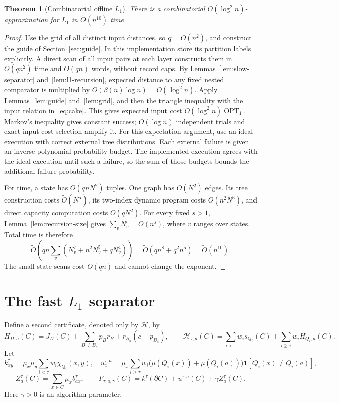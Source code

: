 \documentclass[11pt]{article}
\newtheorem{theorem}{Theorem}[section]
\theoremstyle{definition}
\newcommand{\ind}{\mathbf 1}
\newcommand{\OPT}{\operatorname{OPT}}
\newcommand{\wt}{\widetilde}
\newcommand{\join}{\chi}
\newcommand{\cut}{\partial}
\begin{document}
\begin{theorem}[Combinatorial offline $L_1$]\label{thm:slow}
There is a combinatorial $O(\log^2 n)$-approximation for $L_1$ in
$\wt O(n^{10})$ time.
\end{theorem}
\begin{proof}
Use the grid of all distinct input distances, so $q=O(n^2)$, and construct
the guide of Section~\ref{sec:guide}. In this implementation store its
partition labels explicitly. A direct scan of all input pairs at each
layer constructs them in $O(qn^2)$ time and $O(qn)$ words, without
record caps. By Lemmas~\ref{lem:slow-separator}
and~\ref{lem:l1-recursion}, expected distance to any fixed nested
comparator is multiplied by $O(\beta(n)\log n)=O(\log^2 n)$.
Apply Lemmas~\ref{lem:guide} and~\ref{lem:grid}, and then the triangle
inequality with the input relation in~\eqref{eq:cake}. This gives expected
input cost $O(\log^2 n)\OPT_1$. Markov's inequality gives constant success;
$O(\log n)$ independent trials and exact input-cost selection amplify it.
For this expectation argument, use an ideal execution with correct
external tree distributions. Each external failure is given an
inverse-polynomial probability budget. The implemented execution agrees
with the ideal execution until such a failure, so the sum of those
budgets bounds the additional failure probability.

For time, a state has $O(qnN^2)$ tuples. One graph has $O(N^2)$ edges.
Its tree construction costs $\wt O(N^5)$, its two-index dynamic program
costs $O(n^2N^3)$, and direct capacity computation costs $O(qN^2)$.
For every fixed $s>1$, Lemma~\ref{lem:recursion-size} gives
$\sum_vN_v^s=O(n^s)$, where $v$ ranges over states. Total time is therefore
\[
 \wt O\!\left(qn\sum_v(N_v^7+n^2N_v^5+qN_v^4)\right)
 =\wt O(qn^8+q^2n^5)=\wt O(n^{10}).
\]
The small-state scans cost $O(qn)$ and cannot change the exponent.
\end{proof}

\section{The fast \texorpdfstring{$L_1$}{L1} separator}
\label{sec:fast-l1}

Define a second certificate, denoted only by $\mathcal H$, by
\[
 H_{\Pi,a}(C)=J_\Pi(C)+\sum_{B\ne B_a}p_Br_B+r_{B_a}(c-p_{B_a}),
 \qquad
 \mathcal H_{\tau,a}(C)=\sum_{i<\tau}w_is_{Q_i}(C)
                   +\sum_{i\ge\tau}w_iH_{Q_i,a}(C).
\]
Let
\[
 k^\tau_{xy}=\mu_x\mu_y\sum_{i<\tau}w_i\join_{Q_i}(x,y),\quad
 u^{\tau,a}_x=\mu_x\sum_{i\ge\tau}w_i
  \bigl(\mu(Q_i(x))+\mu(Q_i(a))\bigr)\ind[Q_i(x)\ne Q_i(a)],
\]
\[
 Z^\tau_a(C)=\sum_{x\in C}\mu_xb^\tau_{ax},\qquad
 F_{\tau,a,\gamma}(C)=k^\tau(\cut C)+u^{\tau,a}(C)+\gamma Z^\tau_a(C).
\]
Here $\gamma>0$ is an algorithm parameter.
\end{document}
